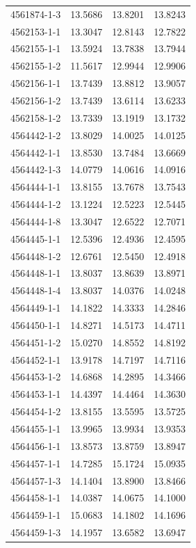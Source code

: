 \begin{longtable}{lrrr}
4561874-1-3 & 13.5686 & 13.8201 & 13.8243 \\
4562153-1-1 & 13.3047 & 12.8143 & 12.7822 \\
4562155-1-1 & 13.5924 & 13.7838 & 13.7944 \\
4562155-1-2 & 11.5617 & 12.9944 & 12.9906 \\
4562156-1-1 & 13.7439 & 13.8812 & 13.9057 \\
4562156-1-2 & 13.7439 & 13.6114 & 13.6233 \\
4562158-1-2 & 13.7339 & 13.1919 & 13.1732 \\
4564442-1-2 & 13.8029 & 14.0025 & 14.0125 \\
4564442-1-1 & 13.8530 & 13.7484 & 13.6669 \\
4564442-1-3 & 14.0779 & 14.0616 & 14.0916 \\
4564444-1-1 & 13.8155 & 13.7678 & 13.7543 \\
4564444-1-2 & 13.1224 & 12.5223 & 12.5445 \\
4564444-1-8 & 13.3047 & 12.6522 & 12.7071 \\
4564445-1-1 & 12.5396 & 12.4936 & 12.4595 \\
4564448-1-2 & 12.6761 & 12.5450 & 12.4918 \\
4564448-1-1 & 13.8037 & 13.8639 & 13.8971 \\
4564448-1-4 & 13.8037 & 14.0376 & 14.0248 \\
4564449-1-1 & 14.1822 & 14.3333 & 14.2846 \\
4564450-1-1 & 14.8271 & 14.5173 & 14.4711 \\
4564451-1-2 & 15.0270 & 14.8552 & 14.8192 \\
4564452-1-1 & 13.9178 & 14.7197 & 14.7116 \\
4564453-1-2 & 14.6868 & 14.2895 & 14.3466 \\
4564453-1-1 & 14.4397 & 14.4464 & 14.3630 \\
4564454-1-2 & 13.8155 & 13.5595 & 13.5725 \\
4564455-1-1 & 13.9965 & 13.9934 & 13.9353 \\
4564456-1-1 & 13.8573 & 13.8759 & 13.8947 \\
4564457-1-1 & 14.7285 & 15.1724 & 15.0935 \\
4564457-1-3 & 14.1404 & 13.8900 & 13.8466 \\
4564458-1-1 & 14.0387 & 14.0675 & 14.1000 \\
4564459-1-1 & 15.0683 & 14.1802 & 14.1696 \\
4564459-1-3 & 14.1957 & 13.6582 & 13.6947 \\

\end{longtable}
